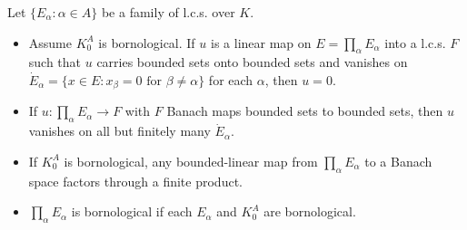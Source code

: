 Let $\{E_\alpha : \alpha \in A\}$ be a family of l.c.s. over $K$.
\begin{itemize}
\item[(a)] Assume $K_0^A$ is bornological. If $u$ is a linear map on $E = \prod_\alpha E_\alpha$ into a l.c.s. $F$ such that $u$ carries bounded sets onto bounded sets and vanishes on $\dot{E}_\alpha = \{x \in E: x_\beta = 0 \text{ for } \beta \neq \alpha\}$ for each $\alpha$, then $u = 0$.
\item[(b)] If $u: \prod_\alpha E_\alpha \to F$ with $F$ Banach maps bounded sets to bounded sets, then $u$ vanishes on all but finitely many $\dot{E}_\alpha$.
\item[(c)] If $K_0^A$ is bornological, any bounded-linear map from $\prod_\alpha E_\alpha$ to a Banach space factors through a finite product.
\item[(d)] $\prod_\alpha E_\alpha$ is bornological if each $E_\alpha$ and $K_0^A$ are bornological.
\end{itemize}
